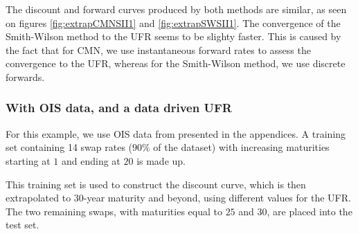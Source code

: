 \medskip

The discount and forward curves produced by both methods are similar, as seen on figures \ref{fig:extrapCMNSII1} and \ref{fig:extrapSWSII1}. The convergence of the Smith-Wilson method to the UFR seems to be slighty faster. This is caused by the fact that for CMN, we use instantaneous forward rates to assess the convergence to the UFR, whereas for the Smith-Wilson method, we use discrete forwards.

\subsubsection{With OIS data, and a data driven UFR}

For this example, we use OIS data from \cite{ametrano2013everything} presented in the appendices. A training set containing 14 swap rates ($90\%$ of the dataset) with increasing maturities starting at $1$ and ending at $20$ is made up. 

\medskip

This training set is used to construct the discount curve, which is then extrapolated to $30$-year maturity and beyond, using different values for the UFR. The two remaining swaps, with maturities equal to $25$ and $30$, are placed into the test set.

